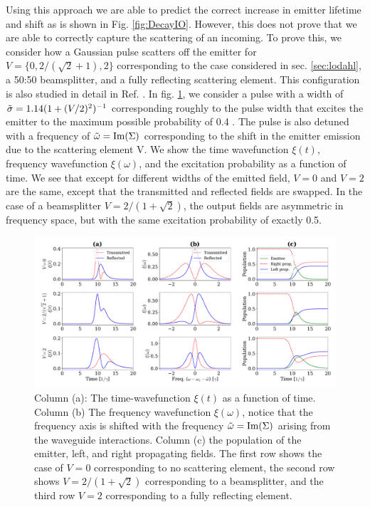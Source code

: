 Using this approach we are able to predict the correct increase in emitter lifetime and shift as is shown in Fig. \ref{fig:DecayIO}. However, this does not prove that we are able to correctly capture the scattering of an incoming. To prove this, we consider how a Gaussian pulse scatters off the emitter for $V=\{0,2/(\sqrt{2}+1),2\}$ corresponding to the case considered in sec. \ref{sec:lodahl}, a 50:50 beamsplitter, and a fully reflecting scattering element. This configuration is also studied in detail in Ref. \cite{Joanesarson2020Few-photonGeometries}. In fig. \ref{fig:fanoIO}, we consider a pulse with a width of $\Tilde{\sigma} = 1.14 (1+(V/2)^2)^{-1}$ corresponding roughly to the pulse width that excites the emitter to the maximum possible probability of 0.4 \cite{Joanesarson2020Few-photonGeometries}. The pulse is also detuned with a frequency of $\Tilde{\omega} = \mathrm{Im}(\Sigma)$ corresponding to the shift in the emitter emission due to the scattering element V. We show the time wavefunction $\xi(t)$, frequency wavefunction $\xi(\omega)$, and the excitation probability as a function of time. We see that except for different widths of the emitted field, $V=0$ and $V=2$ are the same, except that the transmitted and reflected fields are swapped. In the case of a beamsplitter $V=2/(1+\sqrt{2})$, the output fields are asymmetric in frequency space, but with the same excitation probability of exactly 0.5.   

\begin{figure}
    \centering
    \includegraphics[width=\linewidth]{figures/Fanoscattering.pdf}
    \caption{Column (a): The time-wavefunction $\xi(t)$ as a function of time. Column (b) The frequency wavefunction $\xi(\omega)$, notice that the frequency axis is shifted with the frequency $\Tilde{\omega} = \mathrm{Im}(\Sigma)$ arising from the waveguide interactions. Column (c) the population of the emitter, left, and right propagating fields. The first row shows the case of $V=0$ corresponding to no scattering element, the second row shows $V=2/(1+\sqrt{2})$ corresponding to a beamsplitter, and the third row $V=2$ corresponding to a fully reflecting element.  }
    \label{fig:fanoIO}
\end{figure}





